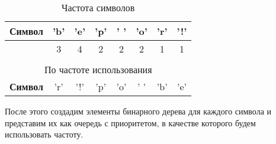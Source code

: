 \begin{table} [htbp]%
  \centering
  \parbox{8cm}%
  {%
    \caption{Частота символов}%
    \label{tabl:tab8x1}%
    \begin{SingleSpace}
    \begin{tabular}{lccccccc}
    \hline
    \multicolumn{1}{|l|}{\textbf{Символ}}                          & \multicolumn{1}{c|}{'b'}                       & \multicolumn{1}{c|}{'e'}                       & \multicolumn{1}{c|}{'p'}                       & \multicolumn{1}{c|}{' '}                       & \multicolumn{1}{c|}{'o'}                       & \multicolumn{1}{c|}{'r'}                       & \multicolumn{1}{c|}{'!'}                       \\ \hline
    \rowcolor[HTML]{EFEFEF}
    \multicolumn{1}{|l|}{\cellcolor[HTML]{EFEFEF}\textbf{Частота}} & \multicolumn{1}{c|}{\cellcolor[HTML]{EFEFEF}3} & \multicolumn{1}{c|}{\cellcolor[HTML]{EFEFEF}4} & \multicolumn{1}{c|}{\cellcolor[HTML]{EFEFEF}2} & \multicolumn{1}{c|}{\cellcolor[HTML]{EFEFEF}2} & \multicolumn{1}{c|}{\cellcolor[HTML]{EFEFEF}2} & \multicolumn{1}{c|}{\cellcolor[HTML]{EFEFEF}1} & \multicolumn{1}{c|}{\cellcolor[HTML]{EFEFEF}1} \\ \hline
    \\
    \multicolumn{8}{c}{По частоте использования}                                                                                                                                                                                                                                                                                                                                                                             \\ \hline
    \multicolumn{1}{|l|}{\textbf{Символ}}                          & \multicolumn{1}{c|}{'r'}                       & \multicolumn{1}{c|}{'!'}                       & \multicolumn{1}{c|}{'p'}                       & \multicolumn{1}{c|}{'o'}                       & \multicolumn{1}{c|}{' '}                       & \multicolumn{1}{c|}{'b'}                       & \multicolumn{1}{c|}{'e'}                       \\ \hline
    \end{tabular}
    \end{SingleSpace}
    }
\end{table}

После этого создадим элементы бинарного дерева для каждого символа и
представим их как очередь с приоритетом, в качестве которого будем
использовать частоту.


